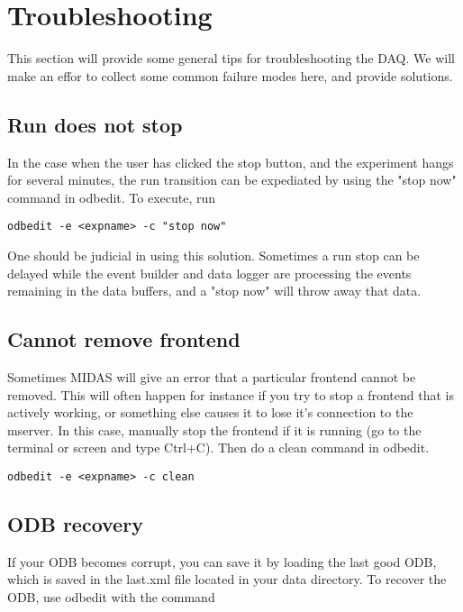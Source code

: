 \section{Troubleshooting}

This section will provide some general tips for troubleshooting the DAQ. We will make an effor to collect some common failure modes here, and provide solutions. 

\subsection{Run does not stop}

In the case when the user has clicked the stop button, and the experiment hangs for several minutes, the run transition can be expediated by using the "stop now" command in odbedit. To execute, run

\begin{verbatim}
odbedit -e <expname> -c "stop now"
\end{verbatim}

One should be judicial in using this solution. Sometimes a run stop can be delayed while the event builder and data logger are processing the events remaining in the data buffers, and a "stop now" will throw away that data.

\subsection{Cannot remove frontend}

Sometimes MIDAS will give an error that a particular frontend cannot be removed. This will often happen for instance if you try to stop a frontend that is actively working, or something else causes it to lose it's connection to the mserver. In this case, manually stop the frontend if it is running (go to the terminal or screen and type Ctrl+C).  Then do a clean command in odbedit.

\begin{verbatim}
odbedit -e <expname> -c clean
\end{verbatim}

\subsection{ODB recovery}

If your ODB becomes corrupt, you can save it by loading the last good ODB, which is saved in the last.xml file located in your data directory. To recover the ODB, use odbedit with the command

